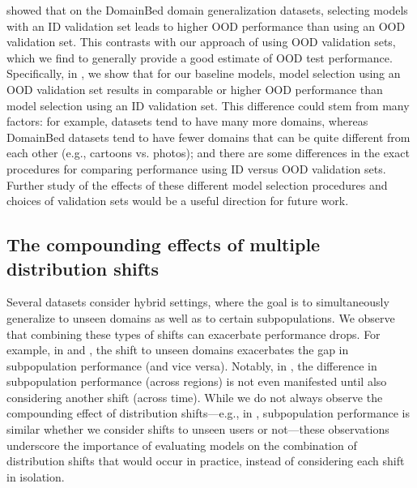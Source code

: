 \citet{gulrajani2020search} showed that on the DomainBed domain generalization datasets, selecting models with an ID validation set leads to higher OOD performance than using an OOD validation set.
This contrasts with our approach of using OOD validation sets, which we find to generally provide a good estimate of OOD test performance.
Specifically, in , we show that for our baseline models, model selection using an OOD validation set results in comparable or higher OOD performance than model selection using an ID validation set.
This difference could stem from many factors: for example, \Wilds datasets tend to have many more domains, whereas DomainBed datasets tend to have fewer domains that can be quite different from each other (e.g., cartoons vs. photos);
and there are some differences in the exact procedures for comparing performance using ID versus OOD validation sets.
Further study of the effects of these different model selection procedures and choices of validation sets would be a useful direction for future work.

\subsection{The compounding effects of multiple distribution shifts}
Several \Wilds datasets consider hybrid settings, where the goal is to simultaneously generalize to unseen domains as well as to certain subpopulations.
We observe that combining these types of shifts can exacerbate performance drops.
For example, in \PovertyMap and \FMoW, the shift to unseen domains exacerbates the gap in subpopulation performance (and vice versa).
Notably, in \FMoW, the difference in subpopulation performance (across regions) is not even manifested until also considering another shift (across time).
While we do not always observe the compounding effect of distribution shifts---e.g., in \Amazon, subpopulation performance is similar whether we consider shifts to unseen users or not---these observations underscore the importance of evaluating models on the combination of distribution shifts that would occur in practice, instead of considering each shift in isolation.
